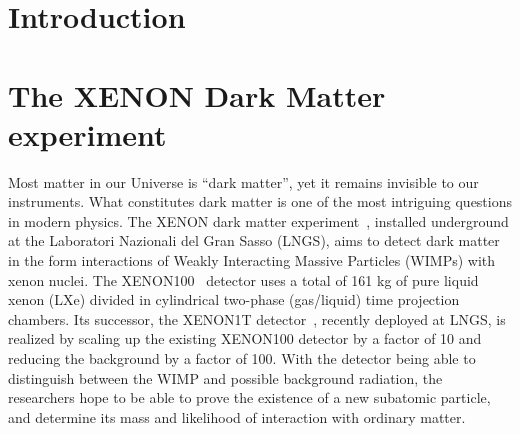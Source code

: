 \documentclass[a4paper]{jpconf}
\begin{document}
\begin{abstract}
\end{abstract}

\section{Introduction}

\lipsum[1-2]


\section{The XENON Dark Matter experiment}
Most matter in our Universe is ``dark matter'', yet it remains invisible to our instruments. What
constitutes dark matter is one of the most intriguing questions in modern physics. 
The XENON dark matter experiment~\cite{Aprile2012573},
installed underground at the Laboratori Nazionali del Gran Sasso (LNGS),
aims to detect dark matter in the form interactions of Weakly 
Interacting Massive Particles (WIMPs) with xenon nuclei.
The XENON100~\cite{aprile2014analysis} detector uses a total of 161 kg of 
pure liquid xenon (LXe) divided in cylindrical two-phase  (gas/liquid)  time  projection  chambers.
Its successor, the XENON1T detector~\cite{aprile2013xenon1t}, recently deployed at LNGS, is 
realized by scaling up the existing XENON100 detector by a factor of 10 and reducing the background by a 
factor of 100. With the detector being able to distinguish between the WIMP and possible 
background radiation, the researchers hope to be able to prove the existence of a new subatomic 
particle, and determine its mass and likelihood of interaction with ordinary matter.
\end{document}
